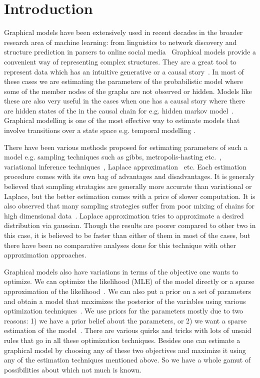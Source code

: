 \section{Introduction}

Graphical models have been extensively used in recent decades in the
broader research area of machine learning: from linguistics to network discovery and
structure prediction in parsers to online social media~\cite{Koller+Friedman:09}
Graphical models provide a convenient way of  representing complex structures.
They are a great tool to represent data which has an intuitive generative
or a causal story~\cite{GettingStarted}. In most of these cases we are
estimating the parameters of the probabilistic model where some of the member
nodes of the graphs are not observed or hidden. Models like these are also very
useful in the cases when one has a causal story where there are hidden states of
the in the causal chain for e.g. hidden markov model~\cite{Baum1967}. Graphical
modelling is one of the most effective way to estimate models that involve
transitions over a state space e.g. temporal modelling
\cite{Arnold:2007:TCM:1281192.1281203}. 

There have been various methods
proposed for estimating parameters of such a model e.g. sampling
techniques such as gibbs, metropolis-hasting
etc.~\cite{Robert:2005:MCS:1051451}, variational inference 
techniques~\cite{citeulike:6420690}, Laplace
approximation~\cite{Azevedo-Filho:1994} etc. Each estimation procedure comes
with its own bag of advantages and disadvantages. It is generaly believed that
sampling stratagies are generally more accurate than variational or Laplace,
but the better estimation comes with a price of slower computation. It is also
observed that many sampling strategies suffer from poor mixing of chains for
high dimensional data~\cite{ShenACOSB10}. Laplace approximation tries to
approximate a desired distribution via gaussian. Though the results are poorer
compared to other two in this case, it is believed to be faster than either of
them in most of the cases, but there have been no comparative analyses done for
this technique with other approximation approaches. 

Graphical models also have
variations in terms of the objective one wants to optimize. We can optimize
the likelihood (MLE) of the model directly or a sparse approximation of the
likelihood~\cite{Banerjee:2008}. We can also put a prior on a set of parameters
and obtain a model that maximizes the posterior of the variables using various
optimization techniques~\cite{abs-0710-0013}. We use priors for the parameters
mostly due to two reasons: 1) we have a prior belief about the parameters, or 2)
we want a sparse estimation of the model~\cite{Yoshida:2010}. There are various
quirks and tricks with lots of unsaid rules that go in all these optimization
techniques. Besides one can estimate a graphical model by choosing any of these
two objectives and maximize it using any of the estimation techniques mentioned
above. So we have a whole gamut of possibilities about which not much is known. 

